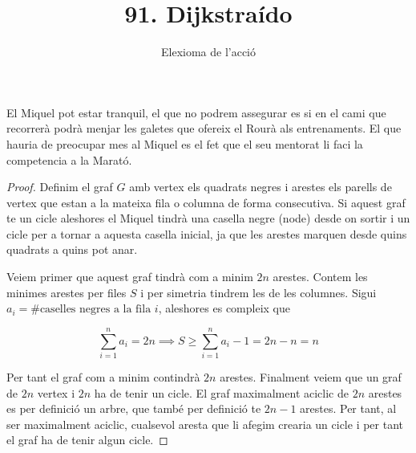 \documentclass[12pt, a4papre]{article}
\author{Elexioma de l'acció}
\title{91. Dijkstraído}
\date{}
\begin{document}
	\maketitle
	
	El Miquel pot estar tranquil, el que no podrem assegurar es si en el cami que recorrerà podrà menjar les galetes que ofereix el Rourà als entrenaments. El que hauria de preocupar mes al Miquel es el fet que el seu mentorat li faci la competencia a la Marató.
	
	\begin{proof} Definim el graf $G$ amb vertex els quadrats negres i arestes els parells de vertex que estan a la mateixa fila o columna de forma consecutiva. Si aquest graf te un cicle aleshores el Miquel tindrà una casella negre (node) desde on sortir i un cicle per a tornar a aquesta casella inicial, ja que les arestes marquen desde quins quadrats a quins pot anar.
	
	Veiem primer que aquest graf tindrà com a minim $2n$ arestes. Contem les minimes arestes per files $S$ i per simetria tindrem les de les columnes. Sigui $a_i = {\#\textrm{caselles negres a la fila } i}$, aleshores es compleix que 
	
	\[
		\sum_{i=1}^n a_i = 2n \implies S \geq \sum_{i=1}^n a_i - 1 = 2n-n = n
	\]
	
	Per tant el graf com a minim contindrà $2n$ arestes. Finalment veiem que un graf de $2n$ vertex i $2n$ ha de tenir un cicle. El graf maximalment aciclic de $2n$ arestes es per definició un arbre, que també per definició te $2n-1$ arestes. Per tant, al ser maximalment aciclic, cualsevol aresta que li afegim crearia un cicle i per tant el graf ha de tenir algun cicle.

	\end{proof}
	
	
	
	
\end{document}
